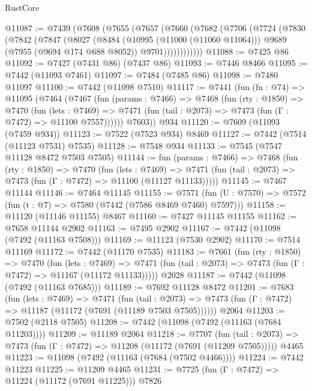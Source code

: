 \begin{lexlean}{RustCore}
\begin{coremodule}
@11087 := @7439
    (@7608
      (@7655
        (@7657
          (@7660
            (@7682
              (@7706
                (@7724
                  (@7830
                    (@7842
                      (@7847
                        (@8027
                          (@8484
                            (@10995 (@11000 (@11060 @11064)))
                            @9689
                            (@7955 (@9694 @174 @688 @8052))
                            @9701))))))))))))
@11088 := @7425 @86
@11092 := @7427 (@7431 @86) (@7437 @86)
@11093 := @7446 @8466
@11095 := @7442 (@11093 @7461)
@11097 := @7484 (@7485 @86)
@11098 := @7480 @11097
@11100 := @7442 (@11098 @7510)
@11117 := @7441
    (fun (fn : @74) =>
    @11095
      (@7464
        (@7467
          (fun (params : @7466) =>
          @7468
            (fun (rty : @1850) =>
            @7470
              (fun (lets : @7469) =>
              @7471 (fun (tail : @2073) => @7473 (fun (Γ : @7472) => @11100 @7557))))))
        @7603))
    @934
@11120 := @7609 (@11093 (@7459 @934))
@11123 := @7522 (@7523 @934) @8469
@11127 := @7442 (@7514 (@11123 @7531) @7535)
@11128 := @7548 @934
@11133 := @7545 (@7547 @11128 @8472 @7503 @7505)
@11144 := fun (params : @7466) =>
  @7468
    (fun (rty : @1850) =>
    @7470
      (fun (lets : @7469) =>
      @7471 (fun (tail : @2073) => @7473 (fun (Γ : @7472) => @11100 (@11127 @11133)))))
@11145 := @7467 @11144
@11146 := @7464 @11145
@11155 := @7571 (fun (U : @7570) => @7572 (fun (t : @7) => @7580 (@7442 (@7586 @8469 @7460) @7597)))
@11158 := @11120 (@11146 @11155) @8467
@11160 := @7427 @11145 @11155
@11162 := @7658 @11144 @2902
@11163 := @7495 @2902
@11167 := @7442 (@11098 (@7492 (@11163 @7508)))
@11169 := @11123 (@7530 @2902)
@11170 := @7514 @11169
@11172 := @7442 (@11170 @7535)
@11183 := @7661
    (fun (rty : @1850) =>
    @7470
      (fun (lets : @7469) =>
      @7471 (fun (tail : @2073) => @7473 (fun (Γ : @7472) => @11167 (@11172 @11133)))))
    @2028
@11187 := @7442 (@11098 (@7492 (@11163 @7685)))
@11189 := @7692 @11128 @8472
@11201 := @7683
    (fun (lets : @7469) =>
    @7471
      (fun (tail : @2073) =>
      @7473 (fun (Γ : @7472) => @11187 (@11172 (@7691 (@11189 @7503 @7505))))))
    @2064
@11203 := @7502 (@2118 @7505)
@11208 := @7442 (@11098 (@7492 (@11163 (@7684 @11203))))
@11209 := @11189 @2064
@11218 := @7707
    (fun (tail : @2073) => @7473 (fun (Γ : @7472) => @11208 (@11172 (@7691 (@11209 @7505)))))
    @4465
@11223 := @11098 (@7492 (@11163 (@7684 (@7502 @4466))))
@11224 := @7442 @11223
@11225 := @11209 @4465
@11231 := @7725 (fun (Γ : @7472) => @11224 (@11172 (@7691 @11225))) @7826

\end{coremodule}
\end{lexlean}
